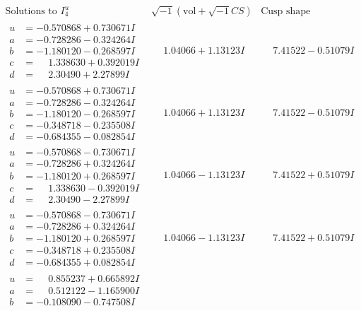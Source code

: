 \documentclass[1p]{elsarticle_modified}
\theoremstyle{definition}
\newcommand{\I}{\sqrt{-1}}
\begin{document}
$$\begin{array}{c|c|c}  
\text{Solutions to }I^u_{4}& \I (\text{vol} + \sqrt{-1}CS) & \text{Cusp shape}\\
 \hline 
\begin{aligned}
u &= -0.570868 + 0.730671 I \\
a &= -0.728286 - 0.324264 I \\
b &= -1.180120 - 0.268597 I \\
c &= \phantom{-}1.338630 + 0.392019 I \\
d &= \phantom{-}2.30490 + 2.27899 I\end{aligned}
 & \phantom{-}1.04066 + 1.13123 I & \phantom{-}7.41522 - 0.51079 I \\ \hline\begin{aligned}
u &= -0.570868 + 0.730671 I \\
a &= -0.728286 - 0.324264 I \\
b &= -1.180120 - 0.268597 I \\
c &= -0.348718 - 0.235508 I \\
d &= -0.684355 - 0.082854 I\end{aligned}
 & \phantom{-}1.04066 + 1.13123 I & \phantom{-}7.41522 - 0.51079 I \\ \hline\begin{aligned}
u &= -0.570868 - 0.730671 I \\
a &= -0.728286 + 0.324264 I \\
b &= -1.180120 + 0.268597 I \\
c &= \phantom{-}1.338630 - 0.392019 I \\
d &= \phantom{-}2.30490 - 2.27899 I\end{aligned}
 & \phantom{-}1.04066 - 1.13123 I & \phantom{-}7.41522 + 0.51079 I \\ \hline\begin{aligned}
u &= -0.570868 - 0.730671 I \\
a &= -0.728286 + 0.324264 I \\
b &= -1.180120 + 0.268597 I \\
c &= -0.348718 + 0.235508 I \\
d &= -0.684355 + 0.082854 I\end{aligned}
 & \phantom{-}1.04066 - 1.13123 I & \phantom{-}7.41522 + 0.51079 I \\ \hline\begin{aligned}
u &= \phantom{-}0.855237 + 0.665892 I \\
a &= \phantom{-}0.512122 - 1.165900 I \\
b &= -0.108090 - 0.747508 I \\

\end{aligned}
\end{array}$$
\end{document}
